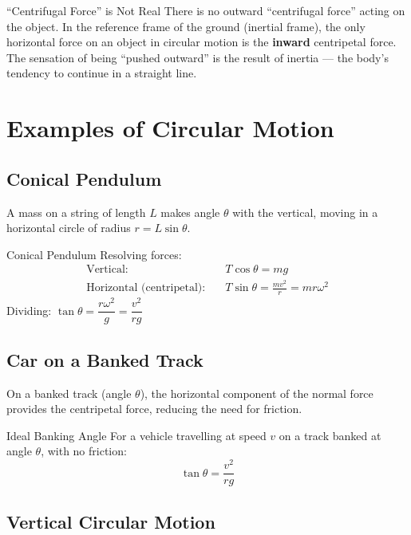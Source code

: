 \begin{warningbox}{``Centrifugal Force'' is Not Real}
There is no outward ``centrifugal force'' acting on the object. In the reference frame of the ground (inertial frame), the only horizontal force on an object in circular motion is the \textbf{inward} centripetal force. The sensation of being ``pushed outward'' is the result of inertia — the body's tendency to continue in a straight line.
\end{warningbox}

\section{Examples of Circular Motion}

\subsection{Conical Pendulum}

A mass on a string of length $L$ makes angle $\theta$ with the vertical, moving in a horizontal circle of radius $r = L\sin\theta$.

\begin{formulabox}{Conical Pendulum}
Resolving forces:
\begin{align*}
\text{Vertical:} \quad & T\cos\theta = mg \\
\text{Horizontal (centripetal):} \quad & T\sin\theta = \frac{mv^2}{r} = mr\omega^2
\end{align*}
Dividing: $\tan\theta = \dfrac{r\omega^2}{g} = \dfrac{v^2}{rg}$
\end{formulabox}

\subsection{Car on a Banked Track}

On a banked track (angle $\theta$), the horizontal component of the normal force provides the centripetal force, reducing the need for friction.

\begin{formulabox}{Ideal Banking Angle}
For a vehicle travelling at speed $v$ on a track banked at angle $\theta$, with no friction:
$$\tan\theta = \frac{v^2}{rg}$$
\end{formulabox}

\subsection{Vertical Circular Motion}

